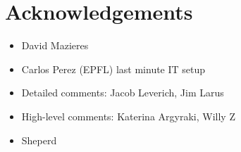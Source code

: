 
\section*{Acknowledgements}

\begin{itemize}
\item David Mazieres
\item Carlos Perez (EPFL) last minute IT setup
\item Detailed comments: Jacob Leverich, Jim Larus
\item High-level comments: Katerina Argyraki, Willy Z
\item Sheperd
\end{itemize}

